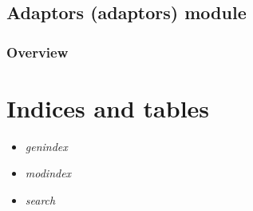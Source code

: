 \documentclass[letterpaper,10pt,english]{sphinxmanual}
\begin{document}
\section{Adaptors (adaptors) module}
\label{adaptors::doc}\label{adaptors:adaptors-adaptors-module}

\subsection{Overview}
\label{adaptors:overview}

\chapter{Indices and tables}
\label{index:indices-and-tables}\begin{itemize}
\item {} 
\emph{genindex}

\item {} 
\emph{modindex}

\item {} 
\emph{search}

\end{itemize}



\renewcommand{\indexname}{Index}
\printindex
\end{document}
